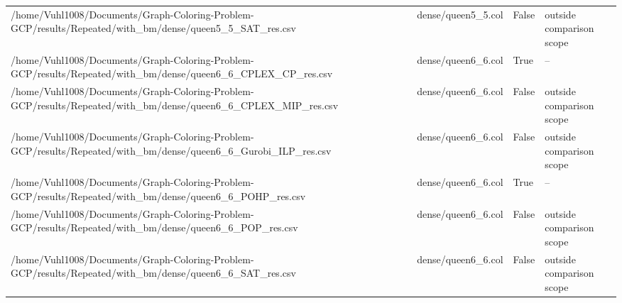\begin{table}[htbp]
\begin{tabular}{llll}
/home/Vuhl1008/Documents/Graph-Coloring-Problem-GCP/results/Repeated/with\_bm/dense/queen5\_5\_SAT\_res.csv & dense/queen5\_5.col & False & outside comparison scope \\
/home/Vuhl1008/Documents/Graph-Coloring-Problem-GCP/results/Repeated/with\_bm/dense/queen6\_6\_CPLEX\_CP\_res.csv & dense/queen6\_6.col & True & -- \\
/home/Vuhl1008/Documents/Graph-Coloring-Problem-GCP/results/Repeated/with\_bm/dense/queen6\_6\_CPLEX\_MIP\_res.csv & dense/queen6\_6.col & False & outside comparison scope \\
/home/Vuhl1008/Documents/Graph-Coloring-Problem-GCP/results/Repeated/with\_bm/dense/queen6\_6\_Gurobi\_ILP\_res.csv & dense/queen6\_6.col & False & outside comparison scope \\
/home/Vuhl1008/Documents/Graph-Coloring-Problem-GCP/results/Repeated/with\_bm/dense/queen6\_6\_POHP\_res.csv & dense/queen6\_6.col & True & -- \\
/home/Vuhl1008/Documents/Graph-Coloring-Problem-GCP/results/Repeated/with\_bm/dense/queen6\_6\_POP\_res.csv & dense/queen6\_6.col & False & outside comparison scope \\
/home/Vuhl1008/Documents/Graph-Coloring-Problem-GCP/results/Repeated/with\_bm/dense/queen6\_6\_SAT\_res.csv & dense/queen6\_6.col & False & outside comparison scope \\
\hline
\end{tabular}
\end{table}
